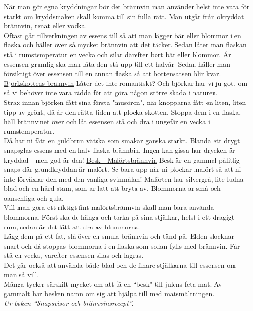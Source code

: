 \vspace{10pt}
\hspace{10pt}När man gör egna kryddningar bör det brännvin 
man använder helst inte vara för starkt om kryddsmaken 
skall komma till sin fulla rätt. Man utgår från okryddat 
brännvin, renat eller vodka.\\
\indent Oftast går tillverkningen av essens till så att man 
lägger bär eller blommor i en flaska och häller över så 
mycket brännvin att det täcker. Sedan låter man flaskan 
stå i rumstemperatur en vecka och silar därefter bort bär 
eller blommor. Är essensen grumlig ska man låta den stå 
upp till ett halvår. Sedan häller man försiktigt över 
essensen till en annan flaska så att bottensatsen blir kvar.
\vspace{10pt}
\underline{Björkskottens brännvin}
\vspace{10pt}
\indent Låter det inte romantiskt? Och björkar har vi ju gott 
om så vi behöver inte vara rädda för att göra någon större 
skada i naturen.\\
\indent Strax innan björken fått sina första "musöron", när 
knopparna fått en liten, liten tipp av grönt, då är den rätta 
tiden att plocka skotten. Stoppa dem i en flaska, häll 
brännvinet över och låt essensen stå och dra i ungefär en 
vecka i rumstemperatur.\\
\indent Då har ni fått en guldbrun vätska som smakar 
ganska starkt. Blanda ett drygt snapsglas essens med en 
halv flaska brännbin. Ingen kan gissa hur drycken är 
kryddad - men god är den!
\vspace{10pt}
\underline{Besk - Malörtsbrännvin}
\vspace{10pt}
\indent Besk är en gammal pålitlig snaps där grundkryddan 
är malört. Se bara upp när ni plockar malört så att ni inte 
förväxlar den med den vanliga svinmålan! Malörten har 
silvergrå, lite ludna blad och en hård stam, som är lätt att 
bryta av. Blommorna är små och oansenliga och gula.\\
\indent Vill man göra ett riktigt fint malörtsbrännvin skall 
man bara använda blommorna. Först ska de hänga och 
torka på sina stjälkar, helst i ett dragigt rum, sedan är det 
lätt att dra av blommorna.\\
\indent Lägg dem på ett fat, slå över en smula brännvin och 
tänd på. Elden slocknar snart och då stoppas blommorna i 
en flaska som sedan fylls med brännvin. Får stå en vecka, 
varefter essensen silas och lagras.\\
\indent Det går också att använda både blad och de finare 
stjälkarna till essensen om man så vill.\\
\indent Många tycker särskilt mycket om att få en ``besk" 
till julens feta mat. Av gammalt har besken namn om sig 
att hjälpa till med matsmältningen.\\
\vspace{10pt}
{\footnotesize\textit{Ur boken ``Snapsvisor och brännvinsrecept''.}}
